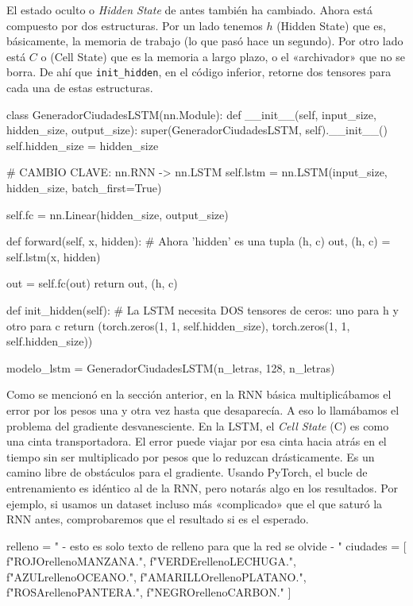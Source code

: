 \documentclass[a4paper,11pt]{article}
\begin{document}
El estado oculto o \emph{Hidden State} de antes también ha cambiado.
Ahora está compuesto por dos estructuras. Por un lado tenemos \(h\)
(Hidden State) que es, básicamente, la memoria de trabajo (lo que pasó
hace un segundo). Por otro lado está \(C\) o (Cell State) que es la
memoria a largo plazo, o el «archivador» que no se borra. De ahí que
\texttt{init\_hidden}, en el código inferior, retorne dos tensores para
cada una de estas estructuras.

\begin{codigo}
class GeneradorCiudadesLSTM(nn.Module):
    def __init__(self, input_size, hidden_size, output_size):
        super(GeneradorCiudadesLSTM, self).__init__()
        self.hidden_size = hidden_size

        # CAMBIO CLAVE: nn.RNN -> nn.LSTM
        self.lstm = nn.LSTM(input_size, hidden_size, batch_first=True)
        
        self.fc = nn.Linear(hidden_size, output_size)
    
    def forward(self, x, hidden):
        # Ahora 'hidden' es una tupla (h, c)
        out, (h, c) = self.lstm(x, hidden)
        
        out = self.fc(out)
        return out, (h, c)

    def init_hidden(self):
        # La LSTM necesita DOS tensores de ceros: uno para h y otro para c
        return (torch.zeros(1, 1, self.hidden_size),
                torch.zeros(1, 1, self.hidden_size))

modelo_lstm = GeneradorCiudadesLSTM(n_letras, 128, n_letras)
\end{codigo}

Como se mencionó en la sección anterior, en la RNN básica
multiplicábamos el error por los pesos una y otra vez hasta que
desaparecía. A eso lo llamábamos el problema del gradiente
desvanesciente. En la LSTM, el \emph{Cell State} (C) es como una cinta
transportadora. El error puede viajar por esa cinta hacia atrás en el
tiempo sin ser multiplicado por pesos que lo reduzcan drásticamente. Es
un camino libre de obstáculos para el gradiente. Usando PyTorch, el
bucle de entrenamiento es idéntico al de la RNN, pero notarás algo en
los resultados. Por ejemplo, si usamos un dataset incluso más
«complicado» que el que saturó la RNN antes, comprobaremos que el
resultado si es el esperado.

\begin{codigo}
relleno = " - esto es solo texto de relleno para que la red se olvide - "
ciudades = [
    f"ROJO{relleno}MANZANA.",
    f"VERDE{relleno}LECHUGA.",
    f"AZUL{relleno}OCEANO.",
    f"AMARILLO{relleno}PLATANO.",
    f"ROSA{relleno}PANTERA.",
    f"NEGRO{relleno}CARBON."
]
\end{codigo}
\end{document}
